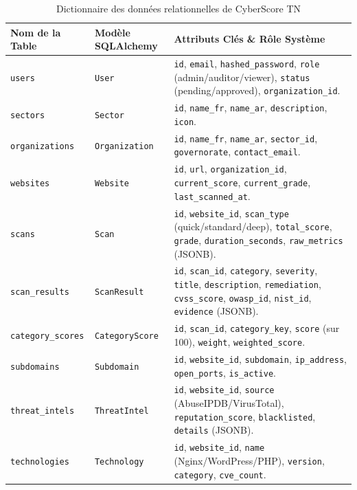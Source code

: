 \begin{table}[!htbp]
\centering
\caption{Dictionnaire des données relationnelles de CyberScore TN}
\label{tab:db_schema}
\begin{singlespace}
\footnotesize
\renewcommand{\arraystretch}{1.08}
\begin{tabularx}{\textwidth}{l p{3.4cm} X}
\toprule
\textbf{Nom de la Table} & \textbf{Modèle SQLAlchemy} & \textbf{Attributs Clés \& Rôle Système} \\
\midrule
\texttt{users} & \texttt{User} & \texttt{id}, \texttt{email}, \texttt{hashed\_password}, \texttt{role} (admin/auditor/viewer), \texttt{status} (pending/approved), \texttt{organization\_id}. \\
\texttt{sectors} & \texttt{Sector} & \texttt{id}, \texttt{name\_fr}, \texttt{name\_ar}, \texttt{description}, \texttt{icon}. \\
\texttt{organizations} & \texttt{Organization} & \texttt{id}, \texttt{name\_fr}, \texttt{name\_ar}, \texttt{sector\_id}, \texttt{governorate}, \texttt{contact\_email}. \\
\texttt{websites} & \texttt{Website} & \texttt{id}, \texttt{url}, \texttt{organization\_id}, \texttt{current\_score}, \texttt{current\_grade}, \texttt{last\_scanned\_at}. \\
\texttt{scans} & \texttt{Scan} & \texttt{id}, \texttt{website\_id}, \texttt{scan\_type} (quick/standard/deep), \texttt{total\_score}, \texttt{grade}, \texttt{duration\_seconds}, \texttt{raw\_metrics} (JSONB). \\
\texttt{scan\_results} & \texttt{ScanResult} & \texttt{id}, \texttt{scan\_id}, \texttt{category}, \texttt{severity}, \texttt{title}, \texttt{description}, \texttt{remediation}, \texttt{cvss\_score}, \texttt{owasp\_id}, \texttt{nist\_id}, \texttt{evidence} (JSONB). \\
\texttt{category\_scores} & \texttt{CategoryScore} & \texttt{id}, \texttt{scan\_id}, \texttt{category\_key}, \texttt{score} (sur 100), \texttt{weight}, \texttt{weighted\_score}. \\
\texttt{subdomains} & \texttt{Subdomain} & \texttt{id}, \texttt{website\_id}, \texttt{subdomain}, \texttt{ip\_address}, \texttt{open\_ports}, \texttt{is\_active}. \\
\texttt{threat\_intels} & \texttt{ThreatIntel} & \texttt{id}, \texttt{website\_id}, \texttt{source} (AbuseIPDB/VirusTotal), \texttt{reputation\_score}, \texttt{blacklisted}, \texttt{details} (JSONB). \\
\texttt{technologies} & \texttt{Technology} & \texttt{id}, \texttt{website\_id}, \texttt{name} (Nginx/WordPress/PHP), \texttt{version}, \texttt{category}, \texttt{cve\_count}. \\

\end{tabularx}
\end{singlespace}
\end{table}
